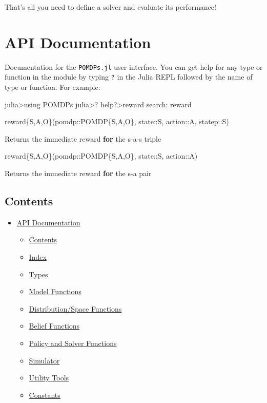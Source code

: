\documentclass[12pt,]{article}
\newenvironment{Shaded}{}{}
\newcommand{\KeywordTok}[1]{\textcolor[rgb]{0.00,0.44,0.13}{\textbf{{#1}}}}
\newcommand{\NormalTok}[1]{{#1}}
\providecommand{\tightlist}{%
  \setlength{\itemsep}{0pt}\setlength{\parskip}{0pt}}
\begin{document}
That's all you need to define a solver and evaluate its performance!

\section{API Documentation}\label{api-documentation}

Documentation for the \texttt{POMDPs.jl} user interface. You can get
help for any type or function in the module by typing \texttt{?} in the
Julia REPL followed by the name of type or function. For example:

\begin{Shaded}
\begin{Highlighting}[]
\NormalTok{julia>using POMDPs}
\NormalTok{julia>?}
\NormalTok{help?>reward}
\NormalTok{search: reward}

  \NormalTok{reward\{S,A,O\}(pomdp::POMDP\{S,A,O\}, state::S, action::A, statep::S)}

  \NormalTok{Returns the immediate reward }\KeywordTok{for} \NormalTok{the s-a-s triple}

  \NormalTok{reward\{S,A,O\}(pomdp::POMDP\{S,A,O\}, state::S, action::A)}

  \NormalTok{Returns the immediate reward }\KeywordTok{for} \NormalTok{the s-a pair}
\end{Highlighting}
\end{Shaded}

\subsection{Contents}\label{contents}

\begin{itemize}
\tightlist
\item
  \href{api.md\#API-Documentation-1}{API Documentation}

  \begin{itemize}
  \tightlist
  \item
    \href{api.md\#Contents-1}{Contents}
  \item
    \href{api.md\#Index-1}{Index}
  \item
    \href{api.md\#Types-1}{Types}
  \item
    \href{api.md\#Model-Functions-1}{Model Functions}
  \item
    \href{api.md\#Distribution/Space-Functions-1}{Distribution/Space
    Functions}
  \item
    \href{api.md\#Belief-Functions-1}{Belief Functions}
  \item
    \href{api.md\#Policy-and-Solver-Functions-1}{Policy and Solver
    Functions}
  \item
    \href{api.md\#Simulator-1}{Simulator}
  \item
    \href{api.md\#Utility-Tools-1}{Utility Tools}
  \item
    \href{api.md\#Constants-1}{Constants}
  \end{itemize}
\end{itemize}
\end{document}
